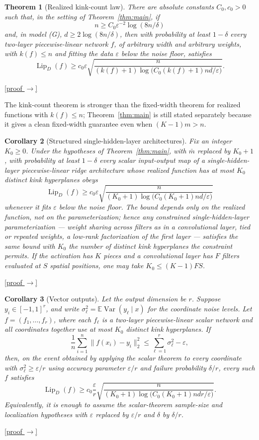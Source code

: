 \documentclass[11pt,reqno]{amsart}
\theoremstyle{plain}
\newtheorem{theorem}{Theorem}[section]
\newtheorem{corollary}[theorem]{Corollary}
\theoremstyle{definition}
\theoremstyle{remark}
\newcommand{\EE}{\mathbb{E}}
\newcommand{\eps}{\varepsilon}
\newcommand{\Lip}{\operatorname{Lip}}
\DeclareMathOperator{\Var}{Var}
\newcommand{\proofbutton}[1]{\hyperref[proof:#1]{\textnormal{\footnotesize\textsf{[proof $\to$]}}}}
\begin{document}
\begin{theorem}[Realized kink-count law]\label{thm:kink}
There are absolute constants $C_0,c_0>0$ such that, in the setting of Theorem~\ref{thm:main}, if
\[
        n\ge C_0\eps^{-2}\log(8n/\delta)
\]
and, in model (G), $d\ge2\log(8n/\delta)$, then with probability at least $1-\delta$ every two-layer piecewise-linear network $f$, of arbitrary width and arbitrary weights, with $k(f)\le n$ and fitting the data $\eps$ below the noise floor, satisfies
\[
\Lip_D(f)\ge c_0\eps\sqrt{\frac{n}{(k(f)+1)\log\!\bigl(C_0(k(f)+1)nd/\eps\bigr)}}.
\]
\end{theorem}
\proofbutton{kink}

The kink-count theorem is stronger than the fixed-width theorem for realized functions with $k(f)\le n$; Theorem~\ref{thm:main} is still stated separately because it gives a clean fixed-width guarantee even when $(K-1)m>n$.

\begin{corollary}[Structured single-hidden-layer architectures]\label{cor:structured}
Fix an integer $K_0\ge0$. Under the hypotheses of Theorem~\ref{thm:main}, with $\bar m$ replaced by $K_0+1$, with probability at least $1-\delta$ every scalar input-output map of a single-hidden-layer piecewise-linear ridge architecture whose realized function has at most $K_0$ distinct kink hyperplanes obeys
\[
\Lip_D(f)\ge c_0\eps\sqrt{\frac{n}{(K_0+1)\log\!\bigl(C_0(K_0+1)nd/\eps\bigr)}}
\]
whenever it fits $\eps$ below the noise floor. The bound depends only on the realized function, not on the parameterization; hence any constrained single-hidden-layer parameterization --- weight sharing across filters as in a convolutional layer, tied or repeated weights, a low-rank factorization of the first layer --- satisfies the same bound with $K_0$ the number of distinct kink hyperplanes the constraint permits. If the activation has $K$ pieces and a convolutional layer has $F$ filters evaluated at $S$ spatial positions, one may take $K_0\le (K-1)FS$.
\end{corollary}
\proofbutton{structured}

\begin{corollary}[Vector outputs]\label{cor:vector}
Let the output dimension be $r$. Suppose $y_i\in[-1,1]^r$, and write $\sigma_\ell^2=\EE\Var(y_\ell\mid x)$ for the coordinate noise levels. Let $f=(f_1,\dots,f_r)$, where each $f_\ell$ is a two-layer piecewise-linear scalar network and all coordinates together use at most $K_0$ distinct kink hyperplanes. If
\[
        \frac1n\sum_{i=1}^n\|f(x_i)-y_i\|_2^2\le\sum_{\ell=1}^r\sigma_\ell^2-\eps,
\]
then, on the event obtained by applying the scalar theorem to every coordinate with $\sigma_\ell^2\ge\eps/r$ using accuracy parameter $\eps/r$ and failure probability $\delta/r$, every such $f$ satisfies
\[
\Lip_D(f)\ge c_0\frac{\eps}{r}\sqrt{\frac{n}{(K_0+1)\log\!\bigl(C_0(K_0+1)ndr/\eps\bigr)}}.
\]
Equivalently, it is enough to assume the scalar-theorem sample-size and localization hypotheses with $\eps$ replaced by $\eps/r$ and $\delta$ by $\delta/r$.
\end{corollary}
\proofbutton{vector}
\end{document}
